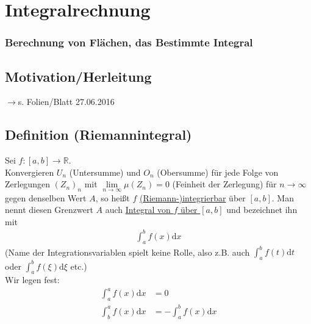 \documentclass[12pt, titlepage]{article}
\newcommand{\R}{\mathds{R}}
\newcommand{\infn}{n\rightarrow\infty}
\renewcommand{\>}{\rightarrow}
\renewcommand{\*}{\cdot}
\begin{document}
	\section{Integralrechnung}
	\subsubsection*{Berechnung von Flächen, das Bestimmte Integral}
	\subsection{Motivation/Herleitung}
	$\>$s. Folien/Blatt 27.06.2016
	\subsection{Definition (Riemannintegral)}
	Sei $f\colon[a,b]\>\R$.\\
	Konvergieren $U_n$ (Untersumme) und $O_n$ (Obersumme) für jede Folge von Zerlegungen $(Z_n)_n$ mit $\lim\limits_{\infn}\mu(Z_n)=0$ (Feinheit der Zerlegung) für $\infn$ gegen denselben Wert $A$, so heißt $f$ \underline{(Riemann-)integrierbar} über $[a,b]$. Man nennt diesen Grenzwert $A$ auch \underline{Integral von $f$ über $[a,b]$} und bezeichnet ihn mit
	\begin{align*}
		\int_{a}^{b}f(x)\textrm{d}x
	\end{align*}
	(Name der Integrationsvariablen spielt keine Rolle, also z.B. auch $\int_{a}^{b}f(t)\textrm{d}t$ oder $\int_{a}^{b}f(\xi)\textrm{d}\xi$ etc.)\\
	Wir legen fest:
	\begin{align*}
		\int_{a}^{a}f(x)\textrm{d}x&=0\\
		\int_{b}^{a}f(x)\textrm{d}x&=-\int_{a}^{b}f(x)\textrm{d}x
	\end{align*}
	
	
	
	
\end{document}
